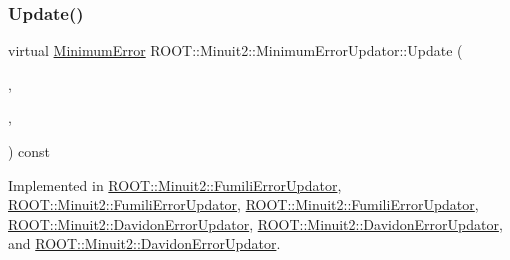 \mbox{\label{classROOT_1_1Minuit2_1_1MinimumErrorUpdator_ae75c33152c49ebf34e6119adc0bbbda9}} 
\subsubsection{\texorpdfstring{Update()}{Update()}\hspace{0.1cm}{\footnotesize\ttfamily [2/3]}}
{\footnotesize\ttfamily virtual \mbox{\hyperlink{classROOT_1_1Minuit2_1_1MinimumError}{Minimum\+Error}} R\+O\+O\+T\+::\+Minuit2\+::\+Minimum\+Error\+Updator\+::\+Update (\begin{DoxyParamCaption}\item[{const \mbox{\hyperlink{classROOT_1_1Minuit2_1_1MinimumState}{Minimum\+State}} \&}]{,  }\item[{const \mbox{\hyperlink{classROOT_1_1Minuit2_1_1MinimumParameters}{Minimum\+Parameters}} \&}]{,  }\item[{const \mbox{\hyperlink{classROOT_1_1Minuit2_1_1FunctionGradient}{Function\+Gradient}} \&}]{ }\end{DoxyParamCaption}) const\hspace{0.3cm}{\ttfamily [pure virtual]}}



Implemented in \mbox{\hyperlink{classROOT_1_1Minuit2_1_1FumiliErrorUpdator_ae5ee7f2052c474169dd19ffbc3755bd3}{R\+O\+O\+T\+::\+Minuit2\+::\+Fumili\+Error\+Updator}}, \mbox{\hyperlink{classROOT_1_1Minuit2_1_1FumiliErrorUpdator_a7a634a18816d8cdc6db8d92b27b69095}{R\+O\+O\+T\+::\+Minuit2\+::\+Fumili\+Error\+Updator}}, \mbox{\hyperlink{classROOT_1_1Minuit2_1_1FumiliErrorUpdator_a7a634a18816d8cdc6db8d92b27b69095}{R\+O\+O\+T\+::\+Minuit2\+::\+Fumili\+Error\+Updator}}, \mbox{\hyperlink{classROOT_1_1Minuit2_1_1DavidonErrorUpdator_afad671aa523cbd9f17af376c51c3ce97}{R\+O\+O\+T\+::\+Minuit2\+::\+Davidon\+Error\+Updator}}, \mbox{\hyperlink{classROOT_1_1Minuit2_1_1DavidonErrorUpdator_aae088602f78dc3bee91f7ce2534311e9}{R\+O\+O\+T\+::\+Minuit2\+::\+Davidon\+Error\+Updator}}, and \mbox{\hyperlink{classROOT_1_1Minuit2_1_1DavidonErrorUpdator_aae088602f78dc3bee91f7ce2534311e9}{R\+O\+O\+T\+::\+Minuit2\+::\+Davidon\+Error\+Updator}}.

\mbox{\label{classROOT_1_1Minuit2_1_1MinimumErrorUpdator_ae75c33152c49ebf34e6119adc0bbbda9}} 
